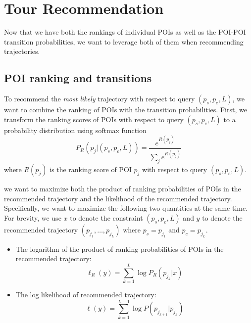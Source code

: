 \section{Tour Recommendation}
\label{sec:recommendation}

Now that we have both the rankings of individual POIs as well as
the POI-POI transition probabilities,
we want to leverage both of them when recommending trajectories.

\subsection{POI ranking and transitions}
To recommend the \textit{most likely} trajectory with respect to query $(p_s, p_e, L)$,
we want to combine the ranking of POIs with the transition probabilities.
First, we transform the ranking scores of POIs with respect to query $(p_s, p_e, L)$
to a probability distribution using softmax function
\begin{displaymath}
    P_R(p_j |(p_s, p_e, L)) = \frac{e^{R(p_j)}}{\sum_j e^{R(p_j)}}
\end{displaymath}
where $R(p_j)$ is the ranking score of POI $p_j$ with respect to query $(p_s, p_e, L)$.

we want to maximize both the product of ranking probabilities of POIs in the recommended trajectory and
the likelihood of the recommended trajectory.
Specifically, we want to maximize the following two quantities at the same time.
For brevity, we use $x$ to denote the constraint $(p_s, p_e, L)$ and $y$ to denote the
recommended trajectory $(p_{j_1}, \dots, p_{j_L})$ where $p_s = p_{j_1}$ and $p_e = p_{j_L}$.
\begin{itemize}
\item The logarithm of the product of ranking probabilities of POIs in the recommended trajectory:
      \begin{displaymath}
          \ell_R(y) = \sum_{k=1}^L \log P_R(p_{j_k} | x)
      \end{displaymath}
\item The log likelihood of recommended trajectory:
      \begin{displaymath}
          \ell(y) = \sum_{k=1}^{L-1} \log P(p_{j_{k+1}} | p_{j_k})
      \end{displaymath}
\end{itemize}

